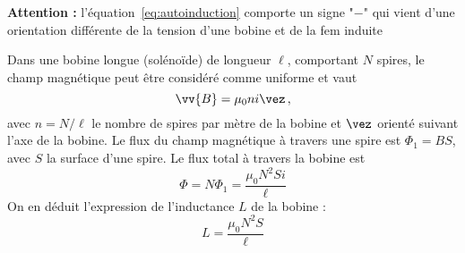 \documentclass{cours}
\begin{document}
\textbf{Attention : } l'équation~\ref{eq:autoinduction} comporte un signe "$-$" qui vient d'une orientation différente de la tension d'une bobine et de la fem induite
\begin{center}
\end{center}
\begin{application}
 Dans une bobine longue (solénoïde) de longueur $\ell$, comportant $N$ spires, le champ magnétique peut être considéré comme uniforme et vaut 
 \begin{equation}
   \vv{B} = \mu_0 n i \vez\,,
 \end{equation}
 avec $n=N/\ell$ le nombre de spires par mètre de la bobine et $\vez$ orienté suivant l'axe de la bobine. Le flux du champ magnétique à travers une spire est $\Phi_1 = BS$, avec $S$ la surface d'une spire. Le flux total à travers la bobine est
 \begin{equation}
   \Phi = N\Phi_1 = \frac{\mu_0N^2Si}{\ell}
 \end{equation}
 On en déduit l'expression de l'inductance $L$ de la bobine : 
 \begin{equation}
 \label{eq:L}
   L = \frac{\mu_0 N^2S}{\ell}
 \end{equation}
\end{application}
\end{document}
